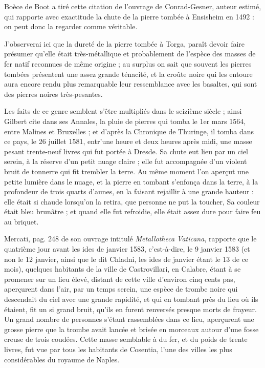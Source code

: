 \documentclass[a4paper, 12pt, oneside, french]{article}
\begin{document}
Boèce de Boot a tiré cette citation de l'ouvrage de Conrad-Gesner, auteur estimé, qui rapporte avec exactitude la chute de la pierre tombée à Ensisheim en 1492 : on peut donc la regarder comme véritable.

J'observerai ici que la dureté de la pierre tombée à Torga, paraît devoir faire présumer qu'elle était très-métallique et probablement de l'espèce des masses de fer natif reconnues de même origine ; au surplus on sait que souvent les pierres tombées présentent une assez grande ténacité, et la croûte noire qui les entoure aura encore rendu plus remarquable leur ressemblance avec les basaltes, qui sont des pierres noires très-pesantes.

Les faits de ce genre semblent s'être multipliés dans le seizième siècle ; ainsi Gilbert cite dans ses Annales, la pluie de pierres qui tomba le 1er mars 1564, entre Malines et Bruxelles ; et d'après la Chronique de Thuringe, il tomba dans ce pays, le 26 juillet 1581, entr'une heure et deux heures après midi, une masse pesant trente-neuf livres qui fut portée à Dresde. Sa chute eut lieu par un ciel serein, à la réserve d'un petit nuage claire ; elle fut accompagnée d'un violent bruit de tonnerre qui fit trembler la terre. Au même moment l'on aperçut une petite lumière dans le nuage, et la pierre en tombant s'enfonça dans la terre, à la profondeur de trois quarts d'aunes, en la faisant rejaillir à une grande hauteur : elle était si chaude lorsqu’on la retira, que personne ne put la toucher, Sa couleur était bleu brunâtre ; et quand elle fut refroidie, elle était assez dure pour faire feu au briquet.

Mercati, pag. 248 de son ouvrage intitulé \emph{Metallotheca Vaticana}, rapporte que le quatrième jour avant les ides de janvier 1583, c'est-à-dire, le 9 janvier 1583 (et non le 12 janvier, ainsi que le dit Chladni, les ides de janvier étant le 13 de ce mois), quelques habitants de la ville de Castrovillari, en Calabre, étant à se promener sur un lieu élevé, distant de cette ville d'environ cinq cents pas, aperçurent dans l'air, par un temps serein, une espèce de trombe noire qui descendait du ciel avec une grande rapidité, et qui en tombant près du lieu où ils étaient, fit un si grand bruit, qu'ils en furent renversés presque morts de frayeur. Un grand nombre de personnes s'étant rassemblées dans ce lieu, aperçurent une grosse pierre que la trombe avait lancée et brisée en morceaux autour d'une fosse creuse de trois coudées. Cette masse semblable à du fer, et du poids de trente livres, fut vue par tous les habitants de Cosentia, l'une des villes les plus considérables du royaume de Naples.
\end{document}

